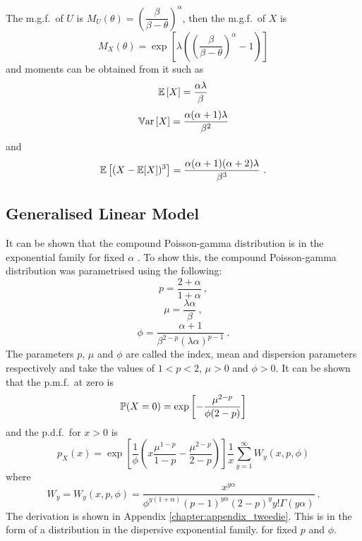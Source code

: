 The m.g.f.~of $U$ is $M_U(\theta) = \left(\dfrac{\beta}{\beta-\theta}\right)^\alpha$, then the m.g.f.~of $X$ is
\begin{equation}
  M_X(\theta)=\exp\left[\lambda\left(\left(\frac{\beta}{\beta-\theta}\right)^{\alpha}-1\right)\right]
\end{equation}
and moments can be obtained from it such as
\begin{equation}
  \operatorname{\mathbb{E}}\left[X\right]=\frac{\alpha\lambda}{\beta}
\end{equation}
\begin{equation}
  \operatorname{\mathbb{V}ar}\left[X\right]=\frac{\alpha(\alpha+1)\lambda}{\beta^2}
  \label{eq:compoundPoisson_variance}
\end{equation}
and
\begin{equation}
  \operatorname{\mathbb{E}}\left[(X-\operatorname{\mathbb{E}}[X])^3\right] = \frac{\alpha(\alpha+1)(\alpha+2)\lambda}{\beta^3}
  \ .
\end{equation}

\subsection{Generalised Linear Model}

It can be shown that the compound Poisson-gamma distribution is in the exponential family for fixed $\alpha$ \citep{jorgensen1987exponential}. To show this, the compound Poisson-gamma distribution was parametrised using the following:
\begin{equation}
  p=\frac{2+\alpha}{1+\alpha}
  \ ,
\end{equation}
\begin{equation}
  \mu=\frac{\lambda\alpha}{\beta}
  \ ,
\end{equation}
\begin{equation}
  \phi = \frac{\alpha+1}{\beta^{2-p}(\lambda\alpha)^{p-1}}
  \ .
\end{equation}
The parameters $p$, $\mu$ and $\phi$ are called the index, mean and dispersion parameters respectively and take the values of $1<p<2$, $\mu>0$ and $\phi>0$. It can be shown that the p.m.f.~at zero is
\begin{equation}
  \operatorname{\mathbb{P}}(X=0) = \exp
  \left[
      -\frac{\mu^{2-p}}{\phi(2-p)}
  \right]
\end{equation}
and the p.d.f.~for $x>0$ is
\begin{equation}
  p_X(x) = 
  \exp\left[
    \frac{1}{\phi}
    \left(
      x\frac{\mu^{1-p}}{1-p}-\frac{\mu^{2-p}}{2-p}
    \right)
  \right]
  \frac{1}{x}
  \sum_{y=1}^{\infty}W_y(x,p,\phi)
\end{equation}
where
\begin{equation}
  W_y = W_y(x,p,\phi)=\frac{x^{y\alpha}}{\phi^{y(1+\alpha)}(p-1)^{y\alpha}(2-p)^yy!\Gamma(y\alpha)}
  \ .
\end{equation}
The derivation is shown in Appendix \ref{chapter:appendix_tweedie}. This is in the form of a distribution in the dispersive exponential family.\citep{nelder1972generalized, nelder1972generalized_2, mccullagh1984generalized} for fixed $p$ and $\phi$.

